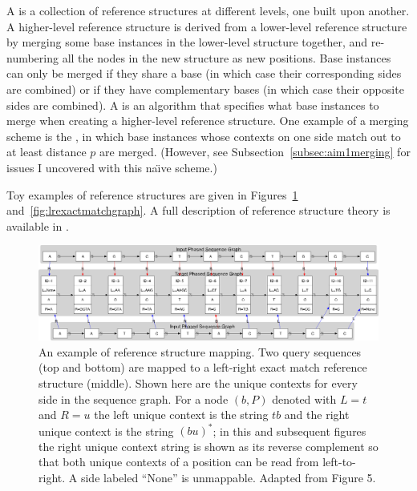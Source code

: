 \documentclass[11pt,proposal]{ucthesis}
\begin{document}
A  is a collection of reference structures at different levels, one built upon another. A higher-level reference structure is derived from a lower-level reference structure by merging some base instances in the lower-level structure together, and re-numbering all the nodes in the new structure as new positions. Base instances can only be merged if they share a base (in which case their corresponding sides are combined) or if they have complementary bases (in which case their opposite sides are combined). A  is an algorithm that specifies what base instances to merge when creating a higher-level reference structure. One example of a merging scheme is the , in which base instances whose contexts on one side match out to at least distance $p$ are merged. (However, see Subsection~\ref{subsec:aim1merging} for issues I uncovered with this na\"{\i}ve scheme.)

Toy examples of reference structures are given in Figures~\ref{fig:lrexactmatch} and~\ref{fig:lrexactmatchgraph}. A full description of reference structure theory is available in \cite{paten2014mapping}.

\begin{figure}[ht]
    \centering
    \includegraphics[width=1.0\textwidth]{figures/lrexactmatch.png}
    \caption[An example of reference structure mapping]{An example of reference structure mapping. Two query sequences (top and bottom) are mapped to a left-right exact match reference structure (middle). Shown here are the unique contexts for every side in the sequence graph. For a node $(b, P)$ denoted with $L=t$ and $R=u$ the left unique context is the string $tb$ and the right unique context is the string $(bu)^*$; in this and subsequent figures the right unique context string is shown as its reverse complement so that both unique contexts of a position can be read from left-to-right. A side labeled ``None'' is unmappable. Adapted from \cite{paten2014mapping} Figure 5.}
    \label{fig:lrexactmatch}
\end{figure}
\end{document}
